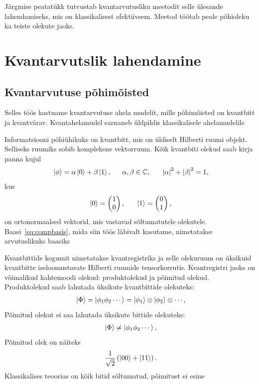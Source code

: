 \documentclass[12pt]{report}
\def\paren#1{\left(#1\right)}
\def\abs#1{\left|#1\right|}
\def\ket#1{\left|#1\right>}
\begin{document}
Järgmise peatatükk tutvustab kvantarvutusliku meetodit selle ülesande lahendamiseks, mis on klassikalisest efektiivsem.
Meetod töötab peale põhioleku ka teiste olekute jaoks.

\chapter{Kvantarvutslik lahendamine}

\section{Kvantarvutuse põhimõisted}

Selles töös kastuame kvantarvutuse ahela mudelit, mille põhimõisted on kvantbitt ja kvantvärav.
Kvantahelamudel sarnaneb üldpildis klassikalisele ahelamudelile~\cite{nielsen+chuang, kaye+laflamme+mosca}

Informatsiooni põhiühikuks on kvantbitt, mis on üldiselt Hilberti ruumi objekt.
Selliseks ruumiks sobib kompleksne vektorruum.
Kõik kvantbiti olekud saab kirja panna kujul
\begin{align}
    \ket{\phi} = \alpha \ket{0} + \beta \ket{1} \rlap{,}
    \qquad \alpha, \beta \in \mathbb{C} \rlap{,}
    \qquad \abs{\alpha}^2 + \abs{\beta}^2 = 1 \rlap{,}
\end{align}
kus
\begin{align}\label{eq:compbasis}
    \ket{0} = \begin{pmatrix}
        1 \\
        0 \\
    \end{pmatrix} \rlap{,}
    \qquad
    \ket{1} = \begin{pmatrix}
        0 \\
        1 \\
    \end{pmatrix} \rlap{,}
\end{align}
on ortonormaalsed vektorid, mis vastavad sõltumatutele olekutele.
Baasi~\eqref{eq:compbasis}, mida siin töös läbivalt kasutame, nimetatakse arvutuslikuks baasiks~\cite{mcardle+etal, nielsen+chuang, kaye+laflamme+mosca}

Kvantbittide kogumit nimetatakse kvantregistriks ja selle olekuruum on üksikuid kvantbitte iseloomustavate Hilberti ruumide tensorkorrutis. 
Kvantregistri jaoks on võimalikud kahtemoodi olekud: produktolekud ja põimitud olekud.
Produktolekud saab lahutada üksikute kvantbittide olekuteks:
\begin{align}
    \ket{\Phi}
    = \ket{\phi_1 \phi_2 \cdots}
    = \ket{\phi_1} \otimes \ket{\phi_2} \otimes \cdots \rlap{,}
\end{align}
Põimitud olekut ei saa lahutada üksikute bittide olekuteks:
\begin{align}
    \ket{\Phi}
    \ne \ket{\phi_1 \phi_2 \cdots} \rlap{,}
\end{align}
Põimitud olek on näiteks
\begin{align}
    \frac{1}{\sqrt{2}} \paren{\ket{00} + \ket{11}} \rlap{.}
\end{align}
Klassikalises teoorias on kõik bitid sõltumatud, põimitust ei esine~\cite{mcardle+etal, nielsen+chuang, kaye+laflamme+mosca}
\end{document}
